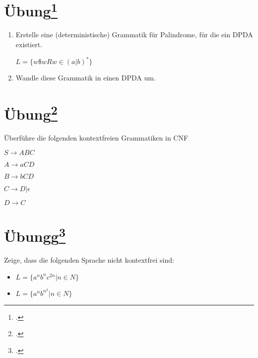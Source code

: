 \documentclass{lehramt-informatik-aufgabe}
\begin{document}
%

\section{Übung\footcite[Seite 34]{theo:fs:2}}

\begin{enumerate}
\item Erstelle eine (deterministische) Grammatik für Palindrome, für die
ein DPDA existiert.

$L = \{ w\$w R w \in (a|b)^* \}$

\item Wandle diese Grammatik in einen DPDA um.
\end{enumerate}

%

\section{Übung\footcite[Seite 37]{theo:fs:2}}

Überführe die folgenden kontextfreien Grammatiken in CNF

$S \rightarrow ABC$

$A \rightarrow aCD$

$B \rightarrow bCD$

$C \rightarrow D | \epsilon$

$D \rightarrow C$

%

\section{Übungg\footcite[Seite 43]{theo:fs:2}}

Zeige, dass die folgenden Sprache nicht kontextfrei sind:

\begin{itemize}
\item $L = \{ a^n b^n c^{2n} | n \in N \}$
\item $L = \{ a^n b^{n^2} | n \in N \}$

\end{itemize}
\end{document}
